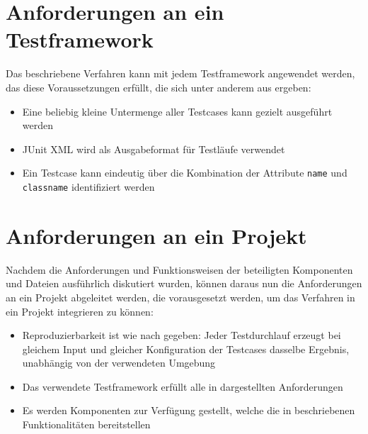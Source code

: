 \section{Anforderungen an ein Testframework}\label{chap:req_testframework}
Das beschriebene Verfahren kann mit jedem Testframework angewendet werden, das diese Voraussetzungen erfüllt, die sich unter anderem aus  ergeben:
\begin{itemize}
    \item Eine beliebig kleine Untermenge aller Testcases kann gezielt ausgeführt werden
    \item JUnit XML wird als Ausgabeformat für Testläufe verwendet
    \item Ein Testcase kann eindeutig über die Kombination der Attribute \texttt{name} und \texttt{classname} identifiziert werden
\end{itemize}

\section{Anforderungen an ein Projekt}\label{chap:Anforderungen_Framework}
Nachdem die Anforderungen und Funktionsweisen der beteiligten Komponenten und Dateien ausführlich diskutiert wurden, können daraus nun die Anforderungen an ein Projekt abgeleitet werden, die vorausgesetzt werden, um das Verfahren in ein Projekt integrieren zu können:
\begin{itemize}
    \item Reproduzierbarkeit ist wie nach  gegeben: Jeder Testdurchlauf erzeugt bei gleichem Input und gleicher Konfiguration der Testcases dasselbe Ergebnis, unabhängig von der verwendeten Umgebung
    \item Das verwendete Testframework erfüllt alle in  dargestellten Anforderungen
    \item Es werden Komponenten zur Verfügung gestellt, welche die in  beschriebenen Funktionalitäten bereitstellen
\end{itemize}


